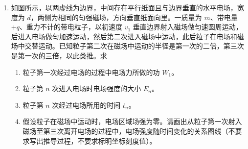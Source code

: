 \documentclass[\gkver]{gaokaozhenti}
\begin{document}
\begin{enumerate}
\item
如图所示，以两虚线为边界，中间存在平行纸面且与边界垂直的水平电场，宽度为 $d$，两侧为相同的匀强磁场，方向垂直纸面向里。一质量为 $m$、带电量 $+q$、重力不计的带电粒子，以初速度 $v_{1}$ 垂直边界射入磁场做匀速圆周运动，后进入电场做匀加速运动，然后第二次进入磁场中运动，此后粒子在电场和磁场中交替运动。已知粒子第二次在磁场中运动的半径是第一次的二倍，第三次是第一次的三倍，以此类推。求
\begin{enumerate}
\item
粒子第一次经过电场的过程中电场力所做的功 $W_{1}$。
\item
粒子第 $n$ 次进入电场时电场强度的大小 $E_{n}$。
\item
粒子第 $n$ 次经过电场所用的时间 $t_{n}$。
\item
假设粒子在磁场中运动时，电场区域场强为零。请画出从粒子第一次射入磁场至第三次离开电场的过程中，电场强度随时间变化的关系图线（不要求写出推导过程，不要求标明坐标刻度值）。
\end{enumerate}
\end{enumerate}
\end{document}
